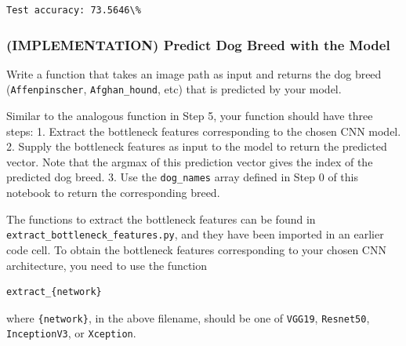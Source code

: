 \documentclass[11pt]{article}
\begin{document}
    \begin{Verbatim}[commandchars=\\\{\}]
Test accuracy: 73.5646\%

    \end{Verbatim}

    \hypertarget{implementation-predict-dog-breed-with-the-model}{%
\subsubsection{(IMPLEMENTATION) Predict Dog Breed with the
Model}\label{implementation-predict-dog-breed-with-the-model}}

Write a function that takes an image path as input and returns the dog
breed (\texttt{Affenpinscher}, \texttt{Afghan\_hound}, etc) that is
predicted by your model.

Similar to the analogous function in Step 5, your function should have
three steps: 1. Extract the bottleneck features corresponding to the
chosen CNN model. 2. Supply the bottleneck features as input to the
model to return the predicted vector. Note that the argmax of this
prediction vector gives the index of the predicted dog breed. 3. Use the
\texttt{dog\_names} array defined in Step 0 of this notebook to return
the corresponding breed.

The functions to extract the bottleneck features can be found in
\texttt{extract\_bottleneck\_features.py}, and they have been imported
in an earlier code cell. To obtain the bottleneck features corresponding
to your chosen CNN architecture, you need to use the function

\begin{verbatim}
extract_{network}
\end{verbatim}

where \texttt{\{network\}}, in the above filename, should be one of
\texttt{VGG19}, \texttt{Resnet50}, \texttt{InceptionV3}, or
\texttt{Xception}.
\end{document}

